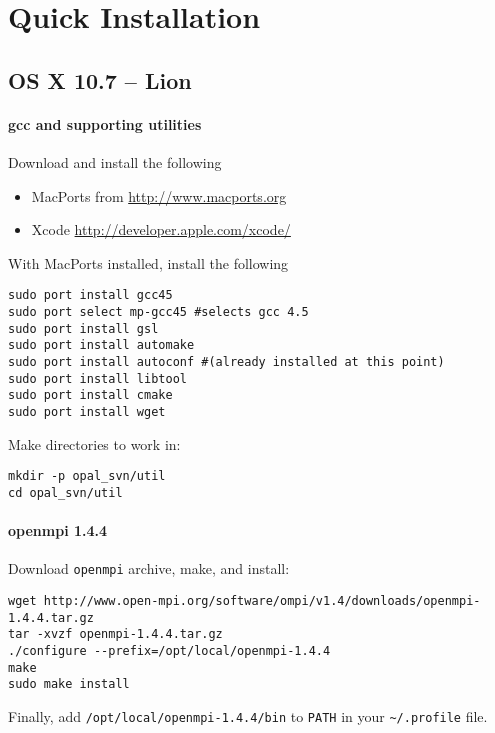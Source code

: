 



\section{Quick Installation}
\subsection{OS X 10.7 -- Lion}


\paragraph{gcc and supporting utilities}
Download and install the following
\begin{itemize}
	\item MacPorts from \url{http://www.macports.org}
	\item Xcode \url{http://developer.apple.com/xcode/}
\end{itemize}
With MacPorts installed, install the following
\begin{footnotesize}
\begin{verbatim}
sudo port install gcc45
sudo port select mp-gcc45 #selects gcc 4.5 
sudo port install gsl
sudo port install automake
sudo port install autoconf #(already installed at this point)
sudo port install libtool
sudo port install cmake
sudo port install wget
\end{verbatim}
\end{footnotesize}
Make directories to work in:
\begin{footnotesize}
\begin{verbatim}
mkdir -p opal_svn/util
cd opal_svn/util
\end{verbatim}
\end{footnotesize}

\paragraph{openmpi 1.4.4}
Download {\tt openmpi} archive, make, and install:
\begin{footnotesize}
\begin{verbatim}
wget http://www.open-mpi.org/software/ompi/v1.4/downloads/openmpi-1.4.4.tar.gz
tar -xvzf openmpi-1.4.4.tar.gz 
./configure --prefix=/opt/local/openmpi-1.4.4
make
sudo make install
\end{verbatim}
\end{footnotesize}
Finally, add \verb+/opt/local/openmpi-1.4.4/bin+ to \verb+PATH+ in your \verb+~/.profile+ file. 


